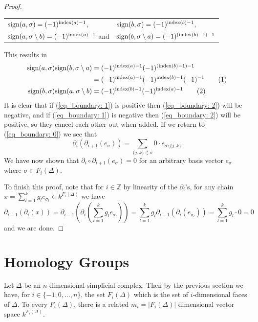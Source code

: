 \documentclass[11pt,a4paper,twoside]{report}
\newcommand\numberthis{\addtocounter{equation}{1}\tag{\theequation}}
\begin{document}
\begin{proof}
\begin{tabular}{l l}
$\textnormal{sign}(a,\sigma) = (-1)^{\textnormal{index}(a)-1}$,  &$\textnormal{sign}(b,\sigma) = (-1)^{\textnormal{index}(b)-1}$,\\
$\textnormal{sign}(a,\sigma\setminus b) = (-1)^{\textnormal{index}(a)-1}$ and &$\textnormal{sign}(b,\sigma\setminus a) = (-1)^{(\textnormal{index}(b)-1)-1}$
\end{tabular}

This results in
\begin{align*}
\textnormal{sign}(a,\sigma)\textnormal{sign}(b,\sigma\setminus a) &= (-1)^{\textnormal{index}(a)-1}(-1)^{(\textnormal{index}(b)-1)-1}\\
&= (-1)^{\textnormal{index}(a)-1}(-1)^{\textnormal{index}(b)-1}(-1)^{-1} \numberthis\label{eq_boundary: 1} \\
\textnormal{sign}(b,\sigma)\textnormal{sign}(a,\sigma\setminus b) &= (-1)^{\textnormal{index}(b)-1}(-1)^{\textnormal{index}(a)-1} \numberthis \label{eq_boundary: 2}\\
\end{align*}
It is clear that if (\ref{eq_boundary: 1}) is positive then (\ref{eq_boundary: 2}) will be negative, and if (\ref{eq_boundary: 1}) is negative then (\ref{eq_boundary: 2}) will be positive, so they cancel each other out when added. If we return to (\ref{eq_boundary: 0}) we see that 
\begin{equation*}
\partial_i(\partial_{i+1}(e_\sigma))=\sum_{\{j,k\}\in\sigma}0\cdot e_{\sigma\setminus\{j,k\}} 
\end{equation*}
We have now shown that $\partial_i\circ\partial_{i+1}(e_\sigma)=0$ for an arbitrary basis vector $e_\sigma$ where $\sigma\in F_i(\Delta)$. 

To finish this proof, note that for $i \in\mathbb{Z}$ by linearity of the $\partial_i$'s, for any chain $x = \sum_{l=1}^kg_le_{\sigma_l}\in k^{F_i(\Delta)}$ we have 
\begin{equation*}
\partial_{i-1}(\partial_i(x)) = \partial_{i-1}\left(\partial_i\left(\sum_{l=1}^kg_le_{\sigma_l}\right)\right) = \sum_{l=1}^kg_l\partial_{i-1}(\partial_i(e_{\sigma_l}))=\sum_{l=1}^kg_l\cdot 0=0
\end{equation*}
and we are done.
\end{proof}

\section{Homology Groups}
Let $\Delta$ be an $n$-dimensional simplicial complex. Then by the previous section we have, for $i\in\{-1,0,\dots,n\}$, the set $F_i(\Delta)$ which is the set of $i$-dimensional faces of $\Delta$. To every $F_i(\Delta)$, there is a related $m_i = |F_i(\Delta)|$ dimensional vector space $k^{F_i(\Delta)}$.
\end{document}
